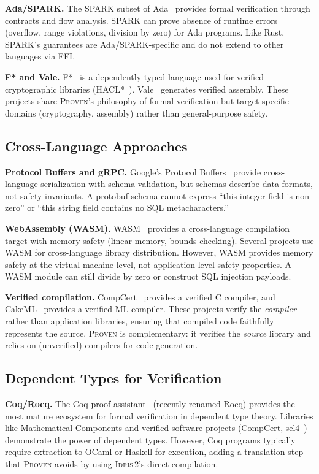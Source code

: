 \documentclass[11pt,a4paper]{article}
\newcommand{\proven}{\textsc{Proven}}
\newcommand{\idris}{\textsc{Idris\,2}}
\begin{document}
\textbf{Ada/SPARK.} The SPARK subset of Ada~\cite{mccormick2015spark}
provides formal verification through contracts and flow analysis. SPARK
can prove absence of runtime errors (overflow, range violations, division
by zero) for Ada programs. Like Rust, SPARK's guarantees are
Ada/SPARK-specific and do not extend to other languages via FFI.

\textbf{F* and Vale.} F*~\cite{swamy2016fstar} is a dependently typed
language used for verified cryptographic libraries (HACL*~\cite{zinzindohoue2017hacl}).
Vale~\cite{bond2017vale} generates verified assembly. These projects
share \proven{}'s philosophy of formal verification but target specific
domains (cryptography, assembly) rather than general-purpose safety.

\subsection{Cross-Language Approaches}

\textbf{Protocol Buffers and gRPC.} Google's Protocol
Buffers~\cite{varda2008protobuf} provide cross-language serialization
with schema validation, but schemas describe data formats, not safety
invariants. A protobuf schema cannot express ``this integer field is
non-zero'' or ``this string field contains no SQL metacharacters.''

\textbf{WebAssembly (WASM).} WASM~\cite{haas2017wasm} provides a
cross-language compilation target with memory safety (linear memory,
bounds checking). Several projects use WASM for cross-language library
distribution. However, WASM provides memory safety at the virtual
machine level, not application-level safety properties. A WASM module
can still divide by zero or construct SQL injection payloads.

\textbf{Verified compilation.} CompCert~\cite{leroy2009compcert} provides
a verified C compiler, and CakeML~\cite{kumar2014cakeml} provides a
verified ML compiler. These projects verify the \emph{compiler} rather
than application libraries, ensuring that compiled code faithfully
represents the source. \proven{} is complementary: it verifies the
\emph{source} library and relies on (unverified) compilers for
code generation.

\subsection{Dependent Types for Verification}

\textbf{Coq/Rocq.} The Coq proof assistant~\cite{bertot2013coq} (recently
renamed Rocq) provides the most mature ecosystem for formal verification
in dependent type theory. Libraries like Mathematical Components and
verified software projects (CompCert, sel4~\cite{klein2009sel4}) demonstrate
the power of dependent types. However, Coq programs typically require
extraction to OCaml or Haskell for execution, adding a translation step
that \proven{} avoids by using \idris{}'s direct compilation.
\end{document}
